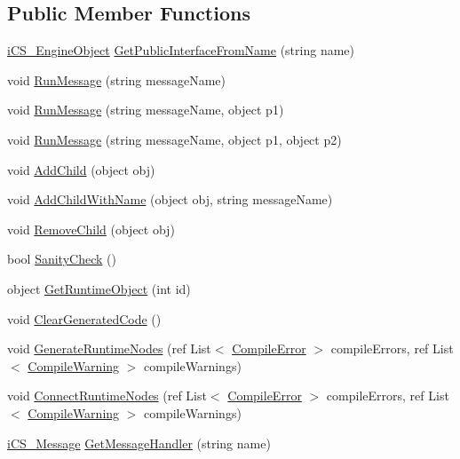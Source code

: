 \subsection*{Public Member Functions}
\begin{DoxyCompactItemize}
\item 
\hyperlink{classi_c_s___engine_object}{i\+C\+S\+\_\+\+Engine\+Object} \hyperlink{classi_c_s___visual_script_imp_ad0e88b317ab56ef9a7af24d641cd3033}{Get\+Public\+Interface\+From\+Name} (string name)
\item 
void \hyperlink{classi_c_s___visual_script_imp_aec7ade89ac3ef485d377e1ef5834a7df}{Run\+Message} (string message\+Name)
\item 
void \hyperlink{classi_c_s___visual_script_imp_a37dea7bc28bac94afb47d85a504a0556}{Run\+Message} (string message\+Name, object p1)
\item 
void \hyperlink{classi_c_s___visual_script_imp_a67150cd5b24ffdc772fa63c196299100}{Run\+Message} (string message\+Name, object p1, object p2)
\item 
void \hyperlink{classi_c_s___visual_script_imp_a49e17513b092b532cd32fcbe9cfbca3a}{Add\+Child} (object obj)
\item 
void \hyperlink{classi_c_s___visual_script_imp_ae3882e627f34eb6c81cfef2750d3a492}{Add\+Child\+With\+Name} (object obj, string message\+Name)
\item 
void \hyperlink{classi_c_s___visual_script_imp_a7e9c7ec769a5c5bda7679188219f479d}{Remove\+Child} (object obj)
\item 
bool \hyperlink{classi_c_s___visual_script_imp_a49bf85655d297896e05922d2c297fc9d}{Sanity\+Check} ()
\item 
object \hyperlink{classi_c_s___visual_script_imp_a9f071604f86084e521f979decd64d03e}{Get\+Runtime\+Object} (int id)
\item 
void \hyperlink{classi_c_s___visual_script_imp_a8b1680aae4f72f5811be856b907f3a0e}{Clear\+Generated\+Code} ()
\item 
void \hyperlink{classi_c_s___visual_script_imp_a03be4acea7425c9c322e11532c9312df}{Generate\+Runtime\+Nodes} (ref List$<$ \hyperlink{i_c_s___visual_script___c_g___inter_visual_script_8cs_a9ccc1e6b1f75452b59286106f93f0c04}{Compile\+Error} $>$ compile\+Errors, ref List$<$ \hyperlink{i_c_s___visual_script___c_g___inter_visual_script_8cs_a9dfbfb22748983a3017dd2f30d60431b}{Compile\+Warning} $>$ compile\+Warnings)
\item 
void \hyperlink{classi_c_s___visual_script_imp_a6f4acfa42351173b06b9e2b2237f4af6}{Connect\+Runtime\+Nodes} (ref List$<$ \hyperlink{i_c_s___visual_script___c_g___inter_visual_script_8cs_a9ccc1e6b1f75452b59286106f93f0c04}{Compile\+Error} $>$ compile\+Errors, ref List$<$ \hyperlink{i_c_s___visual_script___c_g___inter_visual_script_8cs_a9dfbfb22748983a3017dd2f30d60431b}{Compile\+Warning} $>$ compile\+Warnings)
\item 
\hyperlink{classi_c_s___message}{i\+C\+S\+\_\+\+Message} \hyperlink{classi_c_s___visual_script_imp_ae784d3a541bdba97688ae4ebbdb263ac}{Get\+Message\+Handler} (string name)
\end{DoxyCompactItemize}
